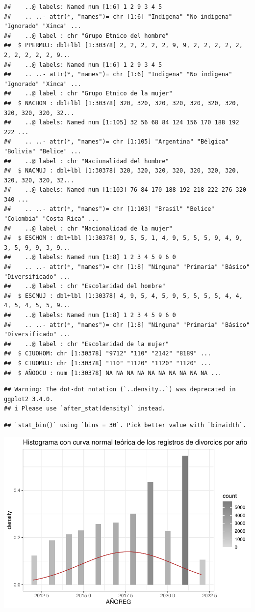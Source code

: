 \documentclass[
]{article}
\begin{document}
\begin{verbatim}
##    ..@ labels: Named num [1:6] 1 2 9 3 4 5
##    .. ..- attr(*, "names")= chr [1:6] "Indigena" "No indigena" "Ignorado" "Xinca" ...
##    ..@ label : chr "Grupo Etnico del hombre"
##  $ PPERMUJ: dbl+lbl [1:30378] 2, 2, 2, 2, 2, 9, 9, 2, 2, 2, 2, 2, 2, 2, 2, 2, 2, 9...
##    ..@ labels: Named num [1:6] 1 2 9 3 4 5
##    .. ..- attr(*, "names")= chr [1:6] "Indigena" "No indigena" "Ignorado" "Xinca" ...
##    ..@ label : chr "Grupo Etnico de la mujer"
##  $ NACHOM : dbl+lbl [1:30378] 320, 320, 320, 320, 320, 320, 320, 320, 320, 320, 32...
##    ..@ labels: Named num [1:105] 32 56 68 84 124 156 170 188 192 222 ...
##    .. ..- attr(*, "names")= chr [1:105] "Argentina" "Bélgica" "Bolivia" "Belice" ...
##    ..@ label : chr "Nacionalidad del hombre"
##  $ NACMUJ : dbl+lbl [1:30378] 320, 320, 320, 320, 320, 320, 320, 320, 320, 320, 32...
##    ..@ labels: Named num [1:103] 76 84 170 188 192 218 222 276 320 340 ...
##    .. ..- attr(*, "names")= chr [1:103] "Brasil" "Belice" "Colombia" "Costa Rica" ...
##    ..@ label : chr "Nacionalidad de la mujer"
##  $ ESCHOM : dbl+lbl [1:30378] 9, 5, 5, 1, 4, 9, 5, 5, 5, 9, 4, 9, 3, 5, 9, 9, 3, 9...
##    ..@ labels: Named num [1:8] 1 2 3 4 5 9 6 0
##    .. ..- attr(*, "names")= chr [1:8] "Ninguna" "Primaria" "Básico" "Diversificado" ...
##    ..@ label : chr "Escolaridad del hombre"
##  $ ESCMUJ : dbl+lbl [1:30378] 4, 9, 5, 4, 5, 9, 5, 5, 5, 5, 4, 4, 4, 5, 4, 5, 5, 9...
##    ..@ labels: Named num [1:8] 1 2 3 4 5 9 6 0
##    .. ..- attr(*, "names")= chr [1:8] "Ninguna" "Primaria" "Básico" "Diversificado" ...
##    ..@ label : chr "Escolaridad de la mujer"
##  $ CIUOHOM: chr [1:30378] "9712" "110" "2142" "8189" ...
##  $ CIUOMUJ: chr [1:30378] "110" "1120" "1120" "1120" ...
##  $ AÑOOCU : num [1:30378] NA NA NA NA NA NA NA NA NA NA ...
\end{verbatim}

\begin{verbatim}
## Warning: The dot-dot notation (`..density..`) was deprecated in ggplot2 3.4.0.
## i Please use `after_stat(density)` instead.
\end{verbatim}

\begin{verbatim}
## `stat_bin()` using `bins = 30`. Pick better value with `binwidth`.
\end{verbatim}

\includegraphics{Proyecto_files/figure-latex/normalHist-1.pdf}
\end{document}
